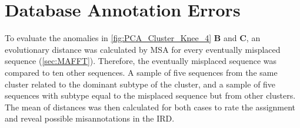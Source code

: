 \section{Database Annotation Errors} \label{sec:Clustering_Anomalies}

To evaluate the anomalies in \autoref{fig:PCA_Cluster_Knee_4} \textbf{\textsf{B}} and \textbf{\textsf{C}}, an evolutionary distance was calculated by \gls{MSA} for every eventually misplaced sequence (\autoref{sec:MAFFT}). Therefore, the eventually misplaced sequence was compared to ten other sequences. A sample of five sequences from the same cluster related to the dominant subtype of the cluster, and a sample of five sequences with subtype equal to the misplaced sequence but from other clusters. The mean of distances was then calculated for both cases to rate the assignment and reveal possible misannotations in the \gls{IRD}. 

\begin{table}[!hbt]
    \centering
    \caption[Anomalies in segment 4 cluster 2 with PK]{\textbf{Anomalies in segment 4 cluster 2 with PK.} The \glspl{MSA} mean distance of the given sequences in comparison to a sample of H1 sequences of the same cluster and a sample of H10 sequences present in other clusters.}
    \label{tab:PCA_Error_4_2}
\end{table}

